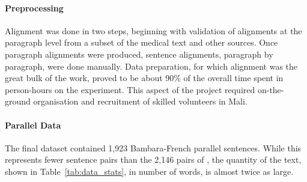 \documentclass[11pt,a4paper]{article}
\begin{document}
\paragraph{Preprocessing} Alignment was done in two steps, beginning with validation of alignments at the paragraph level from a subset of the medical text and other sources. Once paragraph alignments were produced, sentence alignments, paragraph by paragraph, were done manually. Data preparation, for which alignment was the great bulk of the work, proved to be about 90\% of the overall time spent in person-hours on the experiment. This aspect of the project required on-the-ground organisation and recruitment of skilled volunteers in Mali.

\paragraph{Parallel Data}
The final dataset contained 1,923 Bambara-French parallel sentences. While this represents fewer sentence pairs than the 2,146 pairs of \citep{tapo-etal-2020-neural}, the quantity of the text, shown in Table~\ref{tab:data_stats}, in number of words, is almost twice as large. 
\end{document}

